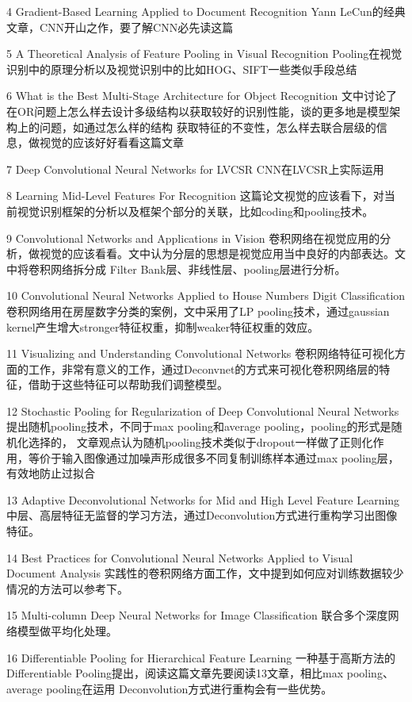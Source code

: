 4 Gradient-Based Learning Applied to Document Recognition
  Yann LeCun的经典文章，CNN开山之作，要了解CNN必先读这篇

5 A Theoretical Analysis of Feature Pooling in Visual Recognition
  Pooling在视觉识别中的原理分析以及视觉识别中的比如HOG、SIFT一些类似手段总结

6 What is the Best Multi-Stage Architecture for Object Recognition
  文中讨论了在OR问题上怎么样去设计多级结构以获取较好的识别性能，谈的更多地是模型架构上的问题，如通过怎么样的结构
  获取特征的不变性，怎么样去联合层级的信息，做视觉的应该好好看看这篇文章

7 Deep Convolutional Neural Networks for LVCSR
  CNN在LVCSR上实际运用

8 Learning Mid-Level Features For Recognition
  这篇论文视觉的应该看下，对当前视觉识别框架的分析以及框架个部分的关联，比如coding和pooling技术。

9 Convolutional Networks and Applications in Vision
  卷积网络在视觉应用的分析，做视觉的应该看看。文中认为分层的思想是视觉应用当中良好的内部表达。文中将卷积网络拆分成
  Filter Bank层、非线性层、pooling层进行分析。

10 Convolutional Neural Networks Applied to House Numbers Digit Classification
  卷积网络用在房屋数字分类的案例，文中采用了LP pooling技术，通过gaussian kernel产生增大stronger特征权重，抑制weaker特征权重的效应。

11 Visualizing and Understanding Convolutional Networks
   卷积网络特征可视化方面的工作，非常有意义的工作，通过Deconvnet的方式来可视化卷积网络层的特征，借助于这些特征可以帮助我们调整模型。

12 Stochastic Pooling for Regularization of Deep Convolutional Neural Networks
   提出随机pooling技术，不同于max pooling和average pooling，pooling的形式是随机化选择的，
   文章观点认为随机pooling技术类似于dropout一样做了正则化作用，等价于输入图像通过加噪声形成很多不同复制训练样本通过max pooling层，有效地防止过拟合

13 Adaptive Deconvolutional Networks for Mid and High Level Feature Learning
   中层、高层特征无监督的学习方法，通过Deconvolution方式进行重构学习出图像特征。

14 Best Practices for Convolutional Neural Networks Applied to Visual Document Analysis
   实践性的卷积网络方面工作，文中提到如何应对训练数据较少情况的方法可以参考下。

15 Multi-column Deep Neural Networks for Image Classification
   联合多个深度网络模型做平均化处理。

16 Differentiable Pooling for Hierarchical Feature Learning
   一种基于高斯方法的Differentiable Pooling提出，阅读这篇文章先要阅读13文章，相比max pooling、average pooling在运用
   Deconvolution方式进行重构会有一些优势。

